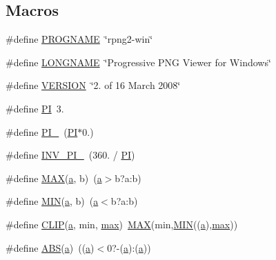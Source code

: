\subsection*{Macros}
\begin{DoxyCompactItemize}
\item 
\#define \mbox{\hyperlink{rpng2-win_8c_a8c9afb758de9a0355c93fc926b8ce6b1}{P\+R\+O\+G\+N\+A\+ME}}~\char`\"{}rpng2-\/win\char`\"{}
\item 
\#define \mbox{\hyperlink{rpng2-win_8c_ae8176192ea4d52bb0acbcfeaaffb3bd8}{L\+O\+N\+G\+N\+A\+ME}}~\char`\"{}Progressive P\+NG Viewer for Windows\char`\"{}
\item 
\#define \mbox{\hyperlink{rpng2-win_8c_a1c6d5de492ac61ad29aec7aa9a436bbf}{V\+E\+R\+S\+I\+ON}}~\char`\"{}2. of 16 March 2008\char`\"{}
\item 
\#define \mbox{\hyperlink{rpng2-win_8c_a598a3330b3c21701223ee0ca14316eca}{PI}}~3.
\item 
\#define \mbox{\hyperlink{rpng2-win_8c_a7c7671235d3f0d09bc5c011920fe0d5b}{P\+I\+\_}}~(\mbox{\hyperlink{rpng2-x_8c_a598a3330b3c21701223ee0ca14316eca}{PI}}$\ast$0.)
\item 
\#define \mbox{\hyperlink{rpng2-win_8c_a99c039c85f9ce3e4a4dc4f95fce32972}{I\+N\+V\+\_\+\+P\+I\+\_}}~(360. / \mbox{\hyperlink{rpng2-x_8c_a598a3330b3c21701223ee0ca14316eca}{PI}})
\item 
\#define \mbox{\hyperlink{rpng2-win_8c_afa99ec4acc4ecb2dc3c2d05da15d0e3f}{M\+AX}}(\mbox{\hyperlink{isa-lr35902_8c_a7015284d2957ab7cdf82d2535a2fa547}{a}},  b)~(\mbox{\hyperlink{isa-lr35902_8c_a7015284d2957ab7cdf82d2535a2fa547}{a}}$>$b?a\+:b)
\item 
\#define \mbox{\hyperlink{rpng2-win_8c_a3acffbd305ee72dcd4593c0d8af64a4f}{M\+IN}}(\mbox{\hyperlink{isa-lr35902_8c_a7015284d2957ab7cdf82d2535a2fa547}{a}},  b)~(\mbox{\hyperlink{isa-lr35902_8c_a7015284d2957ab7cdf82d2535a2fa547}{a}}$<$b?a\+:b)
\item 
\#define \mbox{\hyperlink{rpng2-win_8c_a747f7929e94899e6b0714649864b8711}{C\+L\+IP}}(\mbox{\hyperlink{isa-lr35902_8c_a7015284d2957ab7cdf82d2535a2fa547}{a}},  min,  \mbox{\hyperlink{enough_8c_a3f41d878a34048480562aba063c70c92}{max}})~\mbox{\hyperlink{sqlite3_8c_ad935f1ff1a50822e317bdb321ce991ad}{M\+AX}}(min,\mbox{\hyperlink{sqlite3_8c_adcd021ac91d43a62b2cdecf9a5b971a7}{M\+IN}}((\mbox{\hyperlink{isa-lr35902_8c_a7015284d2957ab7cdf82d2535a2fa547}{a}}),\mbox{\hyperlink{enough_8c_a3f41d878a34048480562aba063c70c92}{max}}))
\item 
\#define \mbox{\hyperlink{rpng2-win_8c_ae2f08dc603ae93c402abd918ba4e23e1}{A\+BS}}(\mbox{\hyperlink{isa-lr35902_8c_a7015284d2957ab7cdf82d2535a2fa547}{a}})~((\mbox{\hyperlink{isa-lr35902_8c_a7015284d2957ab7cdf82d2535a2fa547}{a}})$<$0?-\/(\mbox{\hyperlink{isa-lr35902_8c_a7015284d2957ab7cdf82d2535a2fa547}{a}})\+:(\mbox{\hyperlink{isa-lr35902_8c_a7015284d2957ab7cdf82d2535a2fa547}{a}}))

\end{DoxyCompactItemize}
